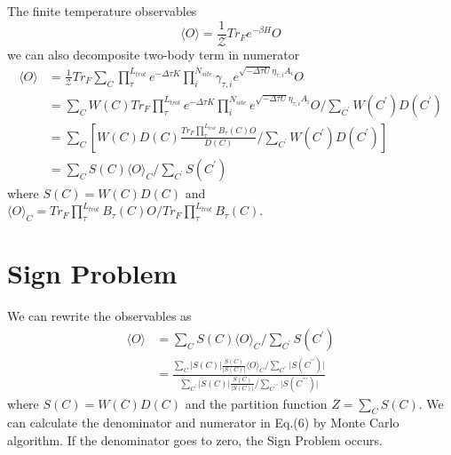 \documentclass{article}
\begin{document}
    The finite temperature observables
    \begin{equation}
        \langle O \rangle = \frac{1}{\mathcal{Z}} Tr_{F} e^{-\beta H} O 
    \end{equation}
    we can also decomposite two-body term in numerator
    \begin{equation}
        \begin{aligned}
            \langle O \rangle &= \frac{1}{\mathcal{Z}} 
            Tr_{F} \sum_{C} \prod^{L_{trot}}_{\tau} e^{-\Delta\tau K} \prod^{N_{site}}_{i} \gamma_{\tau,i} e^{\sqrt{-\Delta\tau U} \eta_{\tau, i} A_{i}} O \\
            &= \sum_{C} W(C) Tr_{F} 
            \prod^{L_{trot}}_{\tau} e^{-\Delta\tau K} \prod^{N_{site}}_{i} e^{\sqrt{-\Delta\tau U} \eta_{\tau, i} A_{i}} O / 
            \sum_{C^{\prime}} W(C^{\prime}) D(C^{\prime}) \\
            &= \sum_{C} \left[ W(C)D(C)  \frac{Tr_{F} \prod^{L_{trot}}_{\tau} B_{\tau}(C) O }{D(C)} / \sum_{C^{\prime}} W(C^{\prime})D(C^{\prime}) \right] \\
            &= \sum_{C} S(C) \langle O \rangle_{C} / \sum_{C^{\prime}} S(C^{\prime})
        \end{aligned}
    \end{equation}
    where $S(C) = W(C)D(C)$ and $ \langle O \rangle_{C} = Tr_{F} \prod^{L_{trot}}_{\tau} B_{\tau}(C) O / Tr_{F} \prod^{L_{trot}}_{\tau} B_{\tau}(C)$.

    \section{Sign Problem}
    We can rewrite the observables as
    \begin{equation}
        \begin{aligned}
            \langle O \rangle 
            &= \sum_{C} S(C) \langle O \rangle_{C} / \sum_{C^{\prime}} S(C^{\prime})\\
            &= \frac{ \sum_{C} \vert S(C) \vert \frac{S(C)}{\vert S(C) \vert} \langle O \rangle_{C} / \sum_{C^{\prime\prime}} \vert S(C^{\prime\prime}) \vert }
            {\sum_{C^{\prime}} \vert S(C) \vert \frac{S(C)}{\vert S(C) \vert} / \sum_{C^{\prime\prime\prime}} \vert S(C^{\prime\prime\prime}) \vert} 
        \end{aligned}
    \end{equation}
    where $S(C) = W(C)D(C)$ and the partition function $Z = \sum_{C} S(C)$.
    We can calculate the denominator and numerator in Eq.(6) by Monte Carlo algorithm.
    If the denominator goes to zero, the Sign Problem occurs.
\end{document}
